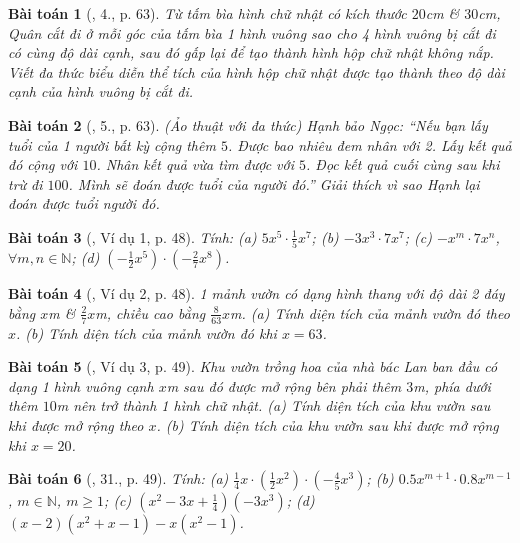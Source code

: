 \documentclass{article}
\newtheorem{baitoan}{Bài toán}
\begin{document}
\begin{baitoan}[\cite{SGK_Toan_7_Canh_Dieu_tap_2}, 4., p. 63]
	Từ tấm bìa hình chữ nhật có kích thước $20$\emph{cm} \& $30$\emph{cm}, Quân cắt đi ở mỗi góc của tấm bìa 1 hình vuông sao cho 4 hình vuông bị cắt đi có cùng độ dài cạnh, sau đó gấp lại để tạo thành hình hộp chữ nhật không nắp. Viết đa thức biểu diễn thể tích của hình hộp chữ nhật được tạo thành theo độ dài cạnh của hình vuông bị cắt đi.
\end{baitoan}

\begin{baitoan}[\cite{SGK_Toan_7_Canh_Dieu_tap_2}, 5., p. 63]
	\emph{(Ảo thuật với đa thức)} Hạnh bảo Ngọc: ``Nếu bạn lấy tuổi của 1 người bất kỳ cộng thêm $5$. Được bao nhiêu đem nhân với 2. Lấy kết quả đó cộng với $10$. Nhân kết quả vừa tìm được với $5$. Đọc kết quả cuối cùng sau khi trừ đi $100$. Mình sẽ đoán được tuổi của người đó.'' Giải thích vì sao Hạnh lại đoán được tuổi người đó.
\end{baitoan}

\begin{baitoan}[\cite{SBT_Toan_7_Canh_Dieu_tap_2}, Ví dụ 1, p. 48]
	Tính: (a) $5x^5\cdot\frac{1}{5}x^7$; (b) $-3x^3\cdot7x^7$; (c) $-x^m\cdot7x^n$, $\forall m,n\in\mathbb{N}$; (d) $\left(-\frac{1}{2}x^5\right)\cdot\left(-\frac{2}{7}x^8\right)$.
\end{baitoan}

\begin{baitoan}[\cite{SBT_Toan_7_Canh_Dieu_tap_2}, Ví dụ 2, p. 48]
	1 mảnh vườn có dạng hình thang với độ dài 2 đáy bằng $x$\emph{m} \& $\frac{2}{7}x$\emph{m}, chiều cao bằng $\frac{8}{63}x$\emph{m}. (a) Tính diện tích của mảnh vườn đó theo $x$. (b) Tính diện tích của mảnh vườn đó khi $x = 63$.
\end{baitoan}

\begin{baitoan}[\cite{SBT_Toan_7_Canh_Dieu_tap_2}, Ví dụ 3, p. 49]
	Khu vườn trồng hoa của nhà bác Lan ban đầu có dạng 1 hình vuông cạnh $x$\emph{m} sau đó được mở rộng bên phải thêm $3$\emph{m}, phía dưới thêm $10$\emph{m} nên trở thành 1 hình chữ nhật. (a) Tính diện tích của khu vườn sau khi được mở rộng theo $x$. (b) Tính diện tích của khu vườn sau khi được mở rộng khi $x = 20$.
\end{baitoan}

\begin{baitoan}[\cite{SBT_Toan_7_Canh_Dieu_tap_2}, 31., p. 49]
	Tính: (a) $\frac{1}{4}x\cdot\left(\frac{1}{2}x^2\right)\cdot\left(-\frac{4}{5}x^3\right)$; (b) $0.5x^{m+1}\cdot0.8x^{m-1}$, $m\in\mathbb{N}$, $m\ge1$; (c) $\left(x^2 - 3x + \frac{1}{4}\right)(-3x^3)$; (d) $(x - 2)(x^2 + x - 1) - x(x^2 - 1)$.
\end{baitoan}
\end{document}
